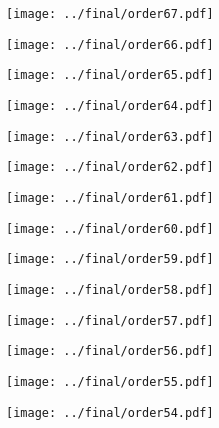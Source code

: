 \documentclass{article}
\begin{document}
\begin{figure}[H]
    \centering
    \texttt{[image: ../final/order67.pdf]}
\end{figure}
\begin{figure}[H]
    \centering
    \texttt{[image: ../final/order66.pdf]}
\end{figure}
\begin{figure}[H]
    \centering
    \texttt{[image: ../final/order65.pdf]}
\end{figure}
\begin{figure}[H]
    \centering
    \texttt{[image: ../final/order64.pdf]}
\end{figure}
\begin{figure}[H]
    \centering
    \texttt{[image: ../final/order63.pdf]}
\end{figure}
\begin{figure}[H]
    \centering
    \texttt{[image: ../final/order62.pdf]}
\end{figure}
\begin{figure}[H]
    \centering
    \texttt{[image: ../final/order61.pdf]}
\end{figure}
\begin{figure}[H]
    \centering
    \texttt{[image: ../final/order60.pdf]}
\end{figure}
\begin{figure}[H]
    \centering
    \texttt{[image: ../final/order59.pdf]}
\end{figure}
\begin{figure}[H]
    \centering
    \texttt{[image: ../final/order58.pdf]}
\end{figure}
\begin{figure}[H]
    \centering
    \texttt{[image: ../final/order57.pdf]}
\end{figure}
\begin{figure}[H]
    \centering
    \texttt{[image: ../final/order56.pdf]}
\end{figure}
\begin{figure}[H]
    \centering
    \texttt{[image: ../final/order55.pdf]}
\end{figure}
\begin{figure}[H]
    \centering
    \texttt{[image: ../final/order54.pdf]}
\end{figure}
\end{document}
